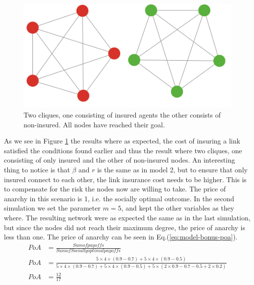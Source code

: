 \begin{figure}[h]
\centering
  \includegraphics[width=0.8\linewidth]{../Figures/BonusGameInsuredClique.png}
  \caption{\label{fig:bonusoptimal} Two cliques, one consisting of insured agents the other consists of non-insured. All nodes have reached their goal. }
\end{figure}
As we see in Figure \ref{fig:bonusoptimal} the results where as expected, the cost of insuring a link satisfied the conditions found earlier and thus the result where two cliques, one consisting of only insured and the other of non-insured nodes.
An interesting thing to notice is that $\beta$ and $r$ is the same as in model 2, but to ensure that only insured connect to each other, the link insurance cost needs to be higher. This is to compensate for the risk the nodes now are willing to take. The price of anarchy in this scenario is 1, i.e. the socially optimal outcome. 
In the second simulation we set the parameter $m=5$, and kept the other variables as they where. The resulting network were as expected the same as in the last simulation, but since the nodes did not reach their maximum degree, the price of anarchy is less than one. The price of anarchy can be seen in Eq.(\ref{eq:model-bonus-poa}).
\begin{eqnarray}
PoA&=\frac{Sum of payoffs}{Sum of Socially optimal payoffs}  \nonumber \\
PoA&=\frac{5\times 4\times (0.9-0.7)+5\times 4\times(0.9-0.5)}{5\times 4\times (0.9-0.7)+5\times 4\times(0.9-0.5)+5\times (2\times 0.9-0.7-0.5 + 2 \times 0.2)}\nonumber \\
PoA&=\frac{12}{17}
\label{eq:model-bonus-poa}
\end{eqnarray}

